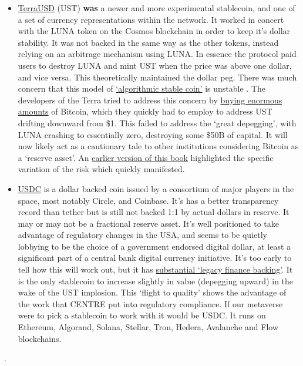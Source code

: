 \begin{itemize}
\item \href{https://assets.website-files.com/611153e7af981472d8da199c/618b02d13e938ae1f8ad1e45_Terra_White_paper.pdf}{TerraUSD} (UST) \textbf{was} a newer and more experimental stablecoin, and one of a set of currency representations within the network. It worked in concert with the LUNA token on the Cosmos blockchain in order to keep it's dollar stability. It was not backed in the same way as the other tokens, instead relying on an arbitrage mechanism using LUNA. In essence the protocol paid users to destroy LUNA and mint UST when the price was above one dollar, and vice versa. This theoretically maintained the dollar peg. There was much concern that this model of \href{https://mirror.xyz/damsondao.eth/OVeBrmrfcWm7uKLlA2Q4W1XTVkFU3cMKfNWhgf7mQuM}{`algorithmic stable coin'} is unstable \cite{clements2021built}. The developers of the Terra tried to address this concern by \href{https://etherscan.io/address/0xad41bd1cf3fd753017ef5c0da8df31a3074ea1ea}{buying enormous amounts} of Bitcoin, which they quickly had to employ to address UST drifting downward from \$1. This failed to address the `great depegging', with LUNA crashing to essentially zero, destroying some \$50B of capital. It will now likely act as a cautionary tale to other institutions considering Bitcoin as a `reserve asset'. An \href{https://github.com/GMCyberFoundry/Metaverse/blob/b06547bf290392d2ff02e5142dae7386d888a9de/Book/04_money.tex#L186}{earlier version of this book} highlighted the specific variation of the risk which quickly manifested.
\item \href{https://f.hubspotusercontent30.net/hubfs/9304636/PDF/centre-whitepaper.pdf}{USDC} is a dollar backed coin issued by a consortium of major players in the space, most notably Circle, and Coinbase. It's has a better transparency record than tether but is still not backed 1:1 by actual dollars in reserve. It may or may not be a fractional reserve asset. It's  well positioned to take advantage of regulatory changes in the USA, and seems to be quietly lobbying to be the choice of a government endorsed digital dollar, at least a significant part of a central bank digital currency initiative. It's too early to tell how this will work out, but it has \href{https://www.forbes.com/sites/ninabambysheva/2022/04/13/blackrocks-newest-investment-paves-the-way-for-digital-assets-on-wall-street/?}{substantial `legacy finance backing'}. It is the only stablecoin to increase slightly in value (depegging upward) in the wake of the UST implosion. This `flight to quality' shows the advantage of the work that CENTRE put into regulatory compliance. If our metaverse were to pick a stablecoin to work with it would be USDC. It runs on Ethereum, Algorand, Solana, Stellar, Tron, Hedera, Avalanche and Flow blockchains. 
\end{itemize}  .

